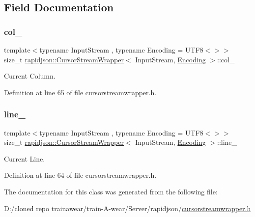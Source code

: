 \subsection{Field Documentation}
\mbox{\label{classrapidjson_1_1_cursor_stream_wrapper_aac18faf6a4d396ddb8b4dfcc04107752}} 
\subsubsection{\texorpdfstring{col\_}{col\_}}
{\footnotesize\ttfamily template$<$typename Input\+Stream , typename Encoding  = U\+T\+F8$<$$>$$>$ \\
size\+\_\+t \mbox{\hyperlink{classrapidjson_1_1_cursor_stream_wrapper}{rapidjson\+::\+Cursor\+Stream\+Wrapper}}$<$ Input\+Stream, \mbox{\hyperlink{classrapidjson_1_1_encoding}{Encoding}} $>$\+::col\+\_\+\hspace{0.3cm}{\ttfamily [private]}}



Current Column. 



Definition at line 65 of file cursorstreamwrapper.\+h.

\mbox{\label{classrapidjson_1_1_cursor_stream_wrapper_a45092cee2d910ac2bfb479794d5a46ef}} 
\subsubsection{\texorpdfstring{line\_}{line\_}}
{\footnotesize\ttfamily template$<$typename Input\+Stream , typename Encoding  = U\+T\+F8$<$$>$$>$ \\
size\+\_\+t \mbox{\hyperlink{classrapidjson_1_1_cursor_stream_wrapper}{rapidjson\+::\+Cursor\+Stream\+Wrapper}}$<$ Input\+Stream, \mbox{\hyperlink{classrapidjson_1_1_encoding}{Encoding}} $>$\+::line\+\_\+\hspace{0.3cm}{\ttfamily [private]}}



Current Line. 



Definition at line 64 of file cursorstreamwrapper.\+h.



The documentation for this class was generated from the following file\+:\begin{DoxyCompactItemize}
\item 
D\+:/cloned repo trainawear/train-\/\+A-\/wear/\+Server/rapidjson/\mbox{\hyperlink{cursorstreamwrapper_8h}{cursorstreamwrapper.\+h}}\end{DoxyCompactItemize}
